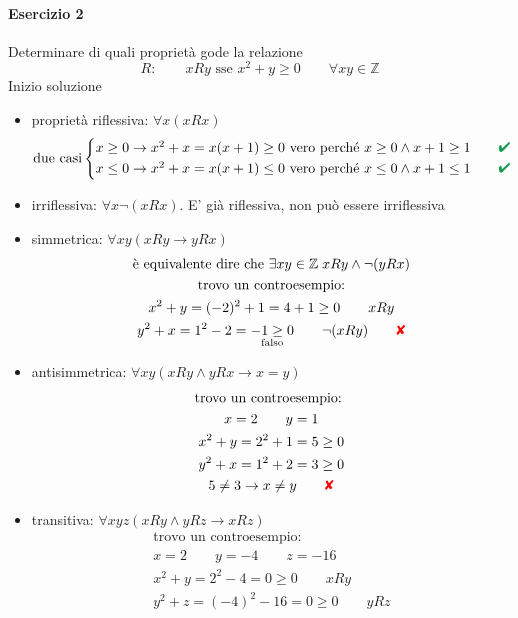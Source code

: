 \documentclass[italian]{article}
\newcommand{\crossmark}{\textcolor{red}{\text{$\qquad$\ding{56}}}}
\renewcommand{\checkmark}{\textcolor{ForestGreen}{\text{$\qquad$\ding{52}}}}
\newcommand{\ins}[1]{\text{$\mathbb{#1}$}}
\begin{document}
\paragraph{Esercizio 2}
Determinare di quali proprietà gode la relazione
\[
	R: \qquad xRy \text{ sse } x^2 + y \geq 0 \qquad \forall xy \in \ins{Z}
\]
Inizio soluzione
\begin{itemize}
	\item proprietà riflessiva: $\forall x(xRx)$
		\begin{gather*}
			\text{due casi}
			\begin{cases*}
				x \geq 0 \to x^2 + x = x(x+1) \geq 0 \text{ vero perché } x\geq 0 \land x+1 \geq 1 \checkmark\\
				x \leq 0 \to x^2 + x = x(x+1) \leq 0 \text{ vero perché } x\leq 0 \land x+1 \leq 1 \checkmark
			\end{cases*}
		\end{gather*}
	\item irriflessiva: $\forall x \lnot(xRx)$. E' già riflessiva, non può essere irriflessiva
	\item simmetrica: $\forall xy (xRy \to yRx)$
		\begin{gather*}
			\text{è equivalente dire che } \exists xy \in \ins{Z} \; xRy \land \lnot(yRx)\\
			\text{trovo un controesempio:}\\
			x^2 + y = (-2)^2 + 1 = 4 + 1 \geq 0 \qquad xRy\\
			y^2 + x = 1^2 - 2 = \underset{\text{falso}}{-1 \geq 0} \qquad \lnot(xRy) \crossmark
		\end{gather*}
	\item antisimmetrica: $\forall xy (xRy \land yRx \to x=y)$
		\begin{gather*}
			\text{trovo un controesempio: } \\
			x=2 \qquad y=1\\
			x^2 + y = 2^2 + 1 = 5 \geq 0\\
			y^2 + x = 1^2 + 2 = 3 \geq 0\\
			5\neq 3 \to x\neq y \crossmark
		\end{gather*}
	\item transitiva: $\forall xyz (xRy \land yRz \to xRz)$
		\begin{gather*}
			\text{trovo un controesempio: } \\
			x=2 \qquad y=-4 \qquad z=-16\\
			x^2 + y = 2^2 - 4 = 0 \geq 0 \qquad xRy\\
			y^2 + z = (-4)^2 - 16 = 0 \geq 0 \qquad yRz \\

\end{gather*}
\end{itemize}
\end{document}
